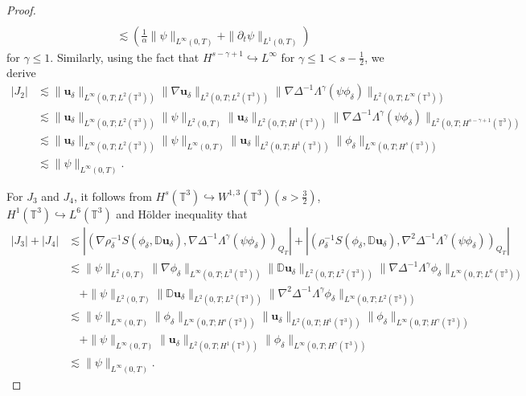 \documentclass[10pt,a4paper]{amsart}
\begin{document}
\begin{proof}
\begin{align}
					\\&\lesssim (\frac{1}{\alpha}\|\psi\|_{L^{\infty}(0,T)}+\|\partial_t\psi\|_{L^{1}(0,T)})
				\end{align}
				for $\gamma\leq 1$.
				Similarly, using the fact that $H^{s-\gamma+1}\hookrightarrow L^{\infty}$ for $\gamma\leq 1<s-\frac{1}{2}$, we derive
				\begin{align}
					\label{lemh55-8}
					\nonumber  |J_{2}|
					& \lesssim \|\mathbf{u}_{\delta}\|_{L^{\infty}(0,T;L^{2}(\mathbb{T}^{3}))}\|\nabla\mathbf{u}_{\delta}\|_{L^{2}(0,T;L^{2}(\mathbb{T}^{3}))}\|\nabla\Delta^{-1}\Lambda^{\gamma} (\psi\phi_{\delta})\|_{L^{2}(0,T;L^{\infty}(\mathbb{T}^{3}))}
					\\&\nonumber\lesssim \|\mathbf{u}_{\delta}\|_{L^{\infty}(0,T;L^{2}(\mathbb{T}^{3}))}\|\psi\|_{L^{2}(0,T)}\|\mathbf{u}_{\delta}\|_{L^{2}(0,T;H^{1}(\mathbb{T}^{3}))}\|\nabla\Delta^{-1}\Lambda^{\gamma} (\psi\phi_{\delta})\|_{L^{2}(0,T;H^{s-\gamma+1}(\mathbb{T}^{3}))}
					\\&\nonumber\lesssim \|\mathbf{u}_{\delta}\|_{L^{\infty}(0,T;L^{2}(\mathbb{T}^{3}))}\|\psi\|_{L^{\infty}(0,T)}\|\mathbf{u}_{\delta}\|_{L^{2}(0,T;H^{1}(\mathbb{T}^{3}))}\| \phi_{\delta}\|_{L^{\infty}(0,T;H^{s}(\mathbb{T}^{3}))}
					\\&\lesssim \|\psi\|_{L^{\infty}(0,T)}.
				\end{align}
				
				
				
				For $J_{3}$ and $J_{4}$,  it follows from $H^{s}(\mathbb{T}^{3})\hookrightarrow W^{1,3}(\mathbb{T}^{3})(s>\frac{3}{2})$, $H^{1}(\mathbb{T}^{3})\hookrightarrow L^{6}(\mathbb{T}^{3})$ and H\"{o}lder inequality  that
				\begin{align}
					\label{lemh55-9}
					\nonumber |J_{3}|+|J_{4}|& \lesssim |(\nabla\rho_{\delta}^{-1}S(\phi_{\delta},\mathbb{ D}\mathbf{u}_{\delta}),\nabla\Delta^{-1}\Lambda^{\gamma}(\psi\phi_{\delta}))_{Q_{T}}|+|(\rho_{\delta}^{-1}S(\phi_{\delta},\mathbb{ D}\mathbf{u}_{\delta}),\nabla^{2}\Delta^{-1}\Lambda^{\gamma}(\psi\phi_{\delta}))_{Q_{T}}|
					\\&\nonumber\lesssim \|\psi\|_{L^{2}(0,T)}\|\nabla\phi_{\delta}\|_{L^{\infty}(0,T;L^{3}(\mathbb{T}^{3}))}\|\mathbb{ D}\mathbf{u}_{\delta}\|_{L^{2}(0,T;L^{2}(\mathbb{T}^{3}))}\|\nabla\Delta^{-1}\Lambda^{\gamma} \phi_{\delta}\|_{L^{\infty}(0,T;L^{6}(\mathbb{T}^{3}))}
					\\&\nonumber \quad+\|\psi\|_{L^{2}(0,T)}\|\mathbb{ D}\mathbf{u}_{\delta}\|_{L^{2}(0,T;L^{2}(\mathbb{T}^{3}))}\|\nabla^{2}\Delta^{-1}\Lambda^{\gamma} \phi_{\delta}\|_{L^{\infty}(0,T;L^{2}(\mathbb{T}^{3}))}
					\\&\nonumber\lesssim \|\psi\|_{L^{\infty}(0,T)}\|\phi_{\delta}\|_{L^{\infty}(0,T;H^{s}(\mathbb{T}^{3}))}\|\mathbf{u}_{\delta}\|_{L^{2}(0,T;H^{1}(\mathbb{T}^{3}))}\| \phi_{\delta}\|_{L^{\infty}(0,T;H^{\gamma}(\mathbb{T}^{3}))}
					\\&\nonumber \quad+\|\psi\|_{L^{\infty}(0,T)}\|\mathbf{u}_{\delta}\|_{L^{2}(0,T;H^{1}(\mathbb{T}^{3}))}\|\phi_{\delta}\|_{L^{\infty}(0,T;H^{\gamma}(\mathbb{T}^{3}))}
					\\&\lesssim\|\psi\|_{L^{\infty}(0,T)}.
				\end{align}
				

\end{proof}
\end{document}
